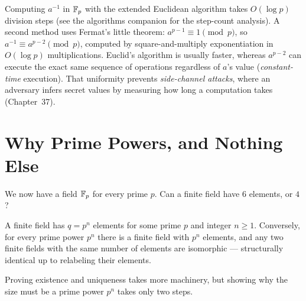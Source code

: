 \begin{connectionbox}
Computing $a^{-1}$ in $\mathbb{F}_p$ with the extended Euclidean algorithm takes
$O(\log p)$ division steps (see the algorithms companion for the step-count
analysis). A second method uses Fermat's little theorem: $a^{p-1}\equiv 1
\pmod p$, so $a^{-1} \equiv a^{p-2} \pmod p$, computed by square-and-multiply
exponentiation in $O(\log p)$ multiplications. Euclid's algorithm is usually
faster, whereas $a^{p-2}$ can execute the exact same sequence of operations
regardless of $a$'s value (\emph{constant-time} execution). That uniformity
prevents \emph{side-channel attacks}, where an adversary infers secret values
by measuring how long a computation takes (Chapter~37).
\end{connectionbox}

\section{Why Prime Powers, and Nothing Else}
\label{ch06:prime-powers}

We now have a field $\mathbb{F}_p$ for every prime $p$. Can a finite field have $6$
elements, or $4$?

\begin{theorem}
\label{ch06:thm-classification}
A finite field has $q = p^n$ elements for some prime $p$ and integer
$n \geq 1$. Conversely, for every prime power $p^n$ there is a finite field
with $p^n$ elements, and any two finite fields with the same number of
elements are isomorphic --- structurally identical up to relabeling their
elements.
\end{theorem}

Proving existence and uniqueness takes more machinery, but showing why the size
must be a prime power $p^n$ takes only two steps.

